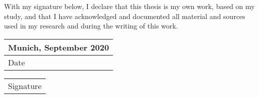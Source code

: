 \vspace{150 pt}
\begin{center}
    \begin{flushleft}
        With my signature below, I declare that this thesis is my own work, based on my study, and that I have acknowledged and documented all material and sources used in my research and during the writing of this work.
    \end{flushleft}
    
    \vspace{180 pt}

    \begin{tabular}{ l }
         Munich, September 2020 \\
         \hline
         Date \hspace{80 pt}    
    \end{tabular}
    \quad
    \begin{tabular}{ l }
         \\
         \hline
         Signature \hspace{100 pt}   
    \end{tabular}
\end{center}